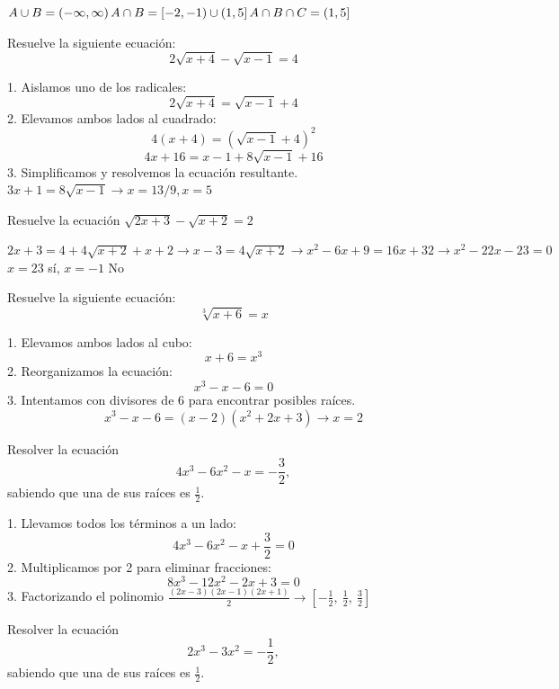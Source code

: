\documentclass[addpoints,spanish, 12pt,a4paper]{exam}
\begin{document}
\begin{questions}
          \begin{solution}  $ A \cup  B = \left(-\infty, \infty\right)  \\  A \cap B= \left[-2, -1\right) \cup \left(1, 5\right]   \\  A \cap B  \cap C= \left(1, 5\right] $  \end{solution}
        

\question[10] Resuelve la siguiente ecuación:
\[
2 \sqrt{x + 4} - \sqrt{x - 1} = 4
\]


\begin{solution}
1. Aislamos uno de los radicales:
   \[
   2 \sqrt{x + 4} = \sqrt{x - 1} + 4
   \]
2. Elevamos ambos lados al cuadrado:
   \[
   4(x + 4) = (\sqrt{x - 1} + 4)^2
   \]
   \[
   4x + 16 = x - 1 + 8 \sqrt{x - 1} + 16
   \]
3. Simplificamos y resolvemos la ecuación resultante.
$3x+1=8 \sqrt{x - 1} \to x=13/9, x=5
 $

\end{solution}

\question Resuelve la ecuación $\sqrt{2x+3}-\sqrt{x+2}=2$
\begin{solution}
    $2x+3=4+4\sqrt{x+2}+x+2 \to x-3=4\sqrt{x+2} \to x^2-6x+9=16x+32\to x^2-22x-23=0$\\
    $x=23$ sí, $x=-1$ No
\end{solution}

\question[10] Resuelve la siguiente ecuación:
\[
\sqrt[3]{x + 6} = x
\]

\begin{solution}
1. Elevamos ambos lados al cubo:
   \[
   x + 6 = x^3
   \]
2. Reorganizamos la ecuación:
   \[
   x^3 - x - 6 = 0
   \]
3. Intentamos con divisores de 6 para encontrar posibles raíces.
$$x^3 - x - 6=\left(x - 2\right) \left(x^{2} + 2 x + 3\right)\to x=2$$
\end{solution}

\question Resolver la ecuación
\[
4x^3 - 6x^2 - x = -\frac{3}{2},
\]
sabiendo que una de sus raíces es \( \frac{1}{2} \).

\begin{solution}
1. Llevamos todos los términos a un lado:
   \[
   4x^3 - 6x^2 - x + \frac{3}{2} = 0
   \]
2. Multiplicamos por 2 para eliminar fracciones:
   \[
   8x^3 - 12x^2 - 2x + 3 = 0
   \]
3. Factorizando el polinomio 
$\frac{\left(2 x - 3\right) \left(2 x - 1\right) \left(2 x + 1\right)}{2} \to \left[ - \frac{1}{2}, \  \frac{1}{2}, \  \frac{3}{2}\right]
$
\end{solution}

\question Resolver la ecuación
\[
2x^3 - 3x^2 = -\frac{1}{2},
\]
sabiendo que una de sus raíces es \( \frac{1}{2} \).


\end{questions}
\end{document}
